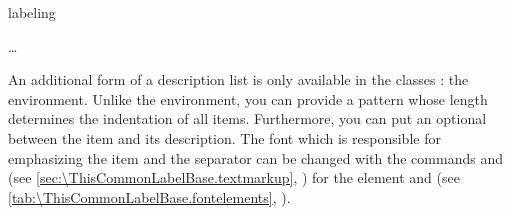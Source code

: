 \begin{Declaration}
  \begin{Environment}{labeling}
    \begin{Body}
      \dots
      \BodyDots
    \end{Body}
  \end{Environment}
\end{Declaration}%
An additional form of a description list is only available in the
{\KOMAScript} classes%
: the
 environment. Unlike the %
 environment, you can provide a
pattern whose length determines the indentation of all items. Furthermore, you
can put an optional  between the item and its description.
The font%
%
which is responsible for emphasizing the item and the separator can be changed
with the commands  and
 (see
\autoref{sec:\ThisCommonLabelBase.textmarkup},
) for the element
 and
 (see
\autoref{tab:\ThisCommonLabelBase.fontelements},
).
